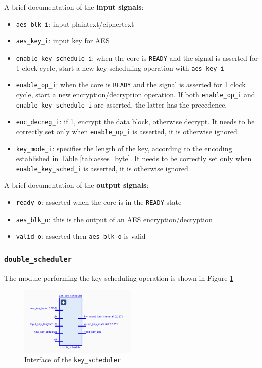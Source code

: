 A brief documentation of the \textbf{input signals}:
\begin{itemize}
	\item \texttt{aes\_blk\_i}: input plaintext/ciphertext
	\item \texttt{aes\_key\_i}: input key for AES
	\item \texttt{enable\_key\_schedule\_i}: when the core is \texttt{READY} and the signal
is asserted for 1 clock cycle, start a new key scheduling operation with \texttt{aes\_key\_i}
	\item \texttt{enable\_op\_i}: when the core is \texttt{READY} and the signal is asserted
for 1 clock cycle, start a new encryption/decryption operation. If both \texttt{enable\_op\_i}
and \texttt{enable\_key\_schedule\_i} are asserted, the latter has the precedence.
	\item \texttt{enc\_decneg\_i}: if 1, encrypt the data block, otherwise decrypt. It needs to
be correctly set only when \texttt{enable\_op\_i} is asserted, it is otherwise ignored.
	\item \texttt{key\_mode\_i}: specifies the length of the key, according to the encoding
established in Table \ref{tab:aeses_byte}. It needs to
be correctly set only when \texttt{enable\_key\_sched\_i} is asserted, it is otherwise ignored.
\end{itemize}

A brief documentation of the \textbf{output signals}:
\begin{itemize}
	\item \texttt{ready\_o}: asserted when the core is in the \texttt{READY} state
	\item \texttt{aes\_blk\_o}: this is the output of an AES encryption/decryption
	\item \texttt{valid\_o}: asserted then \texttt{aes\_blk\_o} is valid
\end{itemize}

\subsubsection{\texttt{double\_scheduler}}

The module performing the key scheduling operation is shown in Figure \ref{fig:key_scheduler}

\begin{figure}[h]
  \centering
  \includegraphics[width=0.5\textwidth]{figures/key_scheduler}
	  \caption{Interface of the \texttt{key\_scheduler}}
  \label{fig:key_scheduler}
\end{figure}


